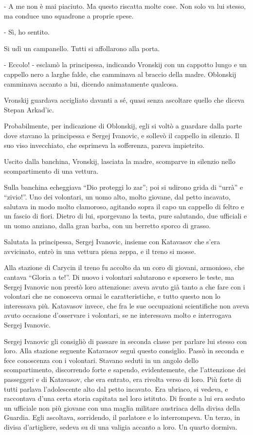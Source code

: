- A me non è mai piaciuto. Ma questo riscatta molte cose. Non solo va lui stesso, ma conduce uno squadrone a proprie spese. 

- Sì, ho sentito. 

Si udì un campanello. Tutti si affollarono alla porta. 

- Eccolo! - esclamò la principessa, indicando Vronskij con un cappotto lungo e un cappello nero a larghe falde, che camminava al braccio della madre. Oblonskij camminava accanto a lui, dicendo animatamente qualcosa. 

Vronskij guardava accigliato davanti a sé, quasi senza ascoltare quello che diceva Stepan Arkad'ic. 

Probabilmente, per indicazione di Oblonskij, egli si voltò a guardare dalla parte dove stavano la principessa e Sergej Ivanovic, e sollevò il cappello in silenzio. Il suo viso invecchiato, che esprimeva la sofferenza, pareva impietrito. 

Uscito dalla banchina, Vronskij, lasciata la madre, scomparve in silenzio nello scompartimento di una vettura. 

Sulla banchina echeggiava ``Dio proteggi lo zar''; poi si udirono grida di ``urrà'' e ``zivio!''. Uno dei volontari, un uomo alto, molto giovane, dal petto incavato, salutava in modo molto clamoroso, agitando sopra il capo un cappello di feltro e un fascio di fiori. Dietro di lui, sporgevano la testa, pure salutando, due ufficiali e un uomo anziano, dalla gran barba, con un berretto sporco di grasso. 

\label{iii-7} 

Salutata la principessa, Sergej Ivanovic, insieme con Katavasov che s'era avvicinato, entrò in una vettura piena zeppa, e il treno si mosse. 

Alla stazione di Carycin il treno fu accolto da un coro di giovani, armonioso, che cantava ``Gloria a te!''. Di nuovo i volontari salutarono e sporsero le teste, ma Sergej Ivanovic non prestò loro attenzione: aveva avuto già tanto a che fare con i volontari che ne conosceva ormai le caratteristiche, e tutto questo non lo interessava più. Katavasov invece, che fra le sue occupazioni scientifiche non aveva avuto occasione d'osservare i volontari, se ne interessava molto e interrogava Sergej Ivanovic. 

Sergej Ivanovic gli consigliò di passare in seconda classe per parlare lui stesso con loro. Alla stazione seguente Katavasov seguì questo consiglio. Passò in seconda e fece conoscenza con i volontari. Stavano seduti in un angolo dello scompartimento, discorrendo forte e sapendo, evidentemente, che l'attenzione dei passeggeri e di Katavasov, che era entrato, era rivolta verso di loro. Più forte di tutti parlava l'adolescente alto dal petto incavato. Era ubriaco, si vedeva, e raccontava d'una certa storia capitata nel loro istituto. Di fronte a lui era seduto un ufficiale non più giovane con una maglia militare austriaca della divisa della Guardia. Egli ascoltava, sorridendo, il parlatore e lo interrompeva. Un terzo, in divisa d'artigliere, sedeva su di una valigia accanto a loro. Un quarto dormiva. 

